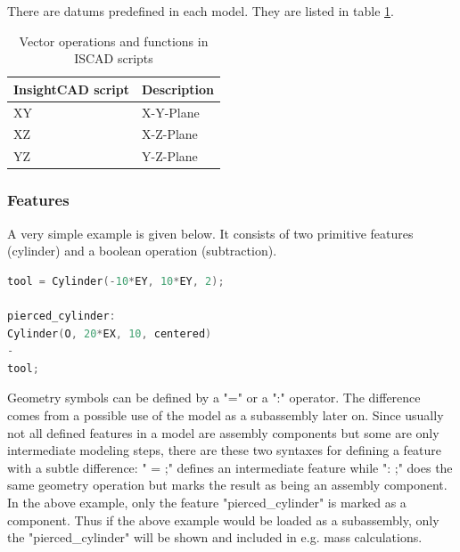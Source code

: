 There are datums predefined in each model. They are listed in table \ref{tab:iscad_datum}.

\begin{table}[h!]
\centering
\begin{tabular}{ll}
InsightCAD script & Description \\
\hline
  XY                      & X-Y-Plane\\
  XZ                      & X-Z-Plane\\
  YZ                      & Y-Z-Plane\\
\end{tabular}
\caption{Vector operations and functions in ISCAD scripts}
\label{tab:iscad_datum}
\end{table}

\subsubsection{Features}

A very simple example is given below. It consists of two primitive
features (cylinder) and a boolean operation (subtraction).

\begin{lstlisting}[language=c++]
tool = Cylinder(-10*EY, 10*EY, 2);

pierced_cylinder:
Cylinder(O, 20*EX, 10, centered)
-
tool;
\end{lstlisting}
    


Geometry symbols can be defined by a "=" or a ":" operator. 
The difference comes from a possible use of the model as a subassembly later
on. Since usually not all defined features in a model are assembly
components but some are only intermediate modeling steps, there are
these two syntaxes for defining a feature with a subtle difference:
" = ;" defines an intermediate feature
while ": ;" does the same geometry
operation but marks the result as being an assembly component. In the
above example, only the feature "pierced\_cylinder" is marked as a
component. Thus if the above example would be loaded as a subassembly,
only the "pierced\_cylinder" will be shown and included in e.g. mass
calculations.

